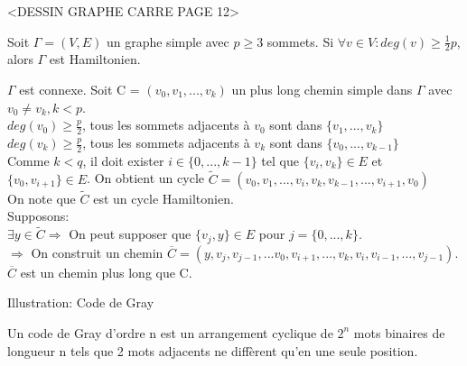 \begin{exmp}
<DESSIN GRAPHE CARRE PAGE 12>
\end{exmp}


\begin{thrm}[Dirac 1950]
Soit $\Gamma = (V,E)$ un graphe simple avec $p \geq 3$ sommets. Si $\forall v \in V: deg(v) \geq \frac{1}{2}p$, alors $\Gamma$ est Hamiltonien.
\end{thrm}

\begin{demo}
$\Gamma$ est connexe. Soit C = $(v_{0},v_{1},...,v_{k})$ un plus long chemin simple dans $\Gamma$ avec $v_{0} \neq v_{k}, k < p$.\\

$ deg(v_{0}) \geq \frac{p}{2}$, tous les sommets adjacents à $v_{0}$ sont dans $\{v_{1},...,v_{k}\}$\\

$ deg(v_{k}) \geq \frac{p}{2}$, tous les sommets adjacents à $v_{k}$ sont dans $\{v_{0},...,v_{k-1}\}$\\

Comme $k < q$, il doit exister $i \in \{0,...,k-1\}$ tel que $\{v_{i},v_{k}\} \in E$ et $\{v_{0},v_{i+1}\} \in E$. On obtient un cycle $\widetilde{C} = (v_{0},v_{1},...,v_{i},v_{k},v_{k-1},...,v_{i+1},v_{0})$ \\



On note que $\widetilde{C}$ est un cycle Hamiltonien.\\

Supposons:\\

$\exists  y \in \widetilde{C} \Rightarrow$ On peut supposer que $\{ v_{j},y\} \in E$ pour $j=\{0,...,k\}$.\\

$\Rightarrow$ On construit un chemin $\overline{C} = (y, v_{j},v_{j-1},...v_{0},v_{i+1},...,v_{k},v_{i},v_{i-1},...,v_{j-1})$. $\overline{C}$ est un chemin plus long que C. \\

\vspace{-0.8cm}



\end{demo}


Illustration: Code de Gray

Un code de Gray d'ordre n est un arrangement cyclique de $2^{n}$ mots binaires de longueur n tels que 2 mots adjacents ne diffèrent qu'en une seule position.\\

